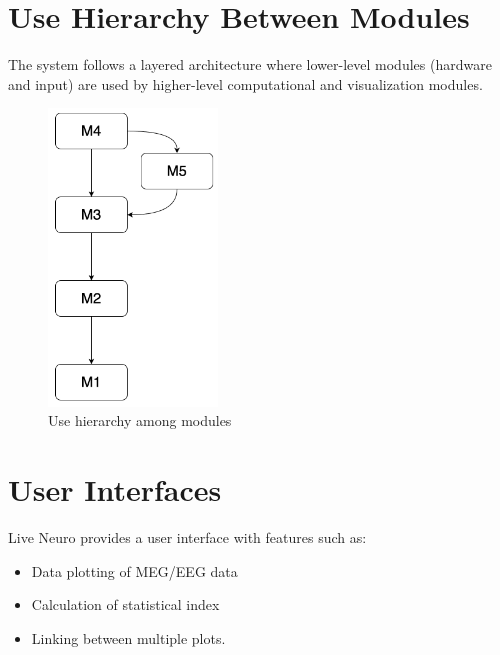 \documentclass[12pt, titlepage]{article}
\begin{document}
\section{Use Hierarchy Between Modules} \label{SecUse}

The system follows a layered architecture where lower-level modules (hardware and input) are used by higher-level computational and visualization modules.



\begin{figure}[H]
\centering
\includegraphics[width=0.4\textwidth]{UseHierarchy.png}
\caption{Use hierarchy among modules}
\label{FigUH}
\end{figure}


\section{User Interfaces}

Live Neuro provides a user interface with features such as:

\begin{itemize}
\item Data plotting of MEG/EEG data


\item Calculation of statistical index


\item Linking between multiple plots.


\end{itemize}
\end{document}
